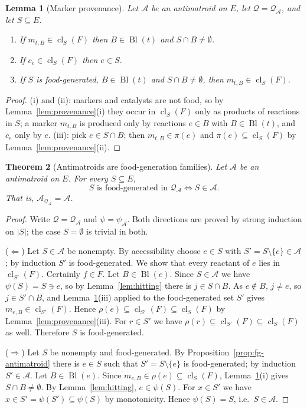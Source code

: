 \documentclass[11pt,a4paper]{article}
\theoremstyle{plain}
\newtheorem{theorem}{Theorem}[section]
\newtheorem{lemma}[theorem]{Lemma}
\theoremstyle{definition}
\theoremstyle{remark}
\newcommand{\cl}{\operatorname{cl}}
\newcommand{\Bl}{\operatorname{Bl}}
\newcommand{\cA}{\mathcal{A}}
\newcommand{\cQ}{\mathcal{Q}}
\begin{document}
\begin{lemma}[Marker provenance]\label{lem:marker-provenance}
Let $\cA$ be an antimatroid on $E$, let $\cQ=\cQ_{\cA}$, and let $S\subseteq E$.
\begin{enumerate}[label=(\roman*)]
\item If $m_{t,B}\in\cl_S(F)$ then $B\in\Bl(t)$ and $S\cap B\neq\emptyset$.
\item If $c_e\in\cl_S(F)$ then $e\in S$.
\item If $S$ is food-generated, $B\in\Bl(t)$ and $S\cap B\neq\emptyset$, then $m_{t,B}\in\cl_S(F)$.
\end{enumerate}
\end{lemma}

\begin{proof}
(i) and (ii): markers and catalysts are not food, so by Lemma~\ref{lem:provenance}(i) they occur in $\cl_S(F)$ only as products of reactions in $S$; a marker $m_{t,B}$ is produced only by reactions $e\in B$ with $B\in\Bl(t)$, and $c_e$ only by $e$. (iii): pick $e\in S\cap B$; then $m_{t,B}\in\pi(e)$ and $\pi(e)\subseteq\cl_S(F)$ by Lemma~\ref{lem:provenance}(ii).
\end{proof}

\begin{theorem}[Antimatroids are food-generation families]\label{thm:antimatroid-realization}
Let $\cA$ be an antimatroid on $E$. For every $S\subseteq E$,
\[
S\text{ is food-generated in }\cQ_{\cA}\iff S\in\cA.
\]
That is, $\cA_{\cQ_{\cA}}=\cA$.
\end{theorem}

\begin{proof}
Write $\cQ=\cQ_{\cA}$ and $\psi=\psi_{\cA}$. Both directions are proved by strong induction on $|S|$; the case $S=\emptyset$ is trivial in both.

($\Leftarrow$) Let $S\in\cA$ be nonempty. By accessibility choose $e\in S$ with $S'=S\setminus\{e\}\in\cA$; by induction $S'$ is food-generated. We show that every reactant of $e$ lies in $\cl_{S'}(F)$. Certainly $f\in F$. Let $B\in\Bl(e)$. Since $S\in\cA$ we have $\psi(S)=S\ni e$, so by Lemma~\ref{lem:hitting} there is $j\in S\cap B$. As $e\notin B$, $j\neq e$, so $j\in S'\cap B$, and Lemma~\ref{lem:marker-provenance}(iii) applied to the food-generated set $S'$ gives $m_{e,B}\in\cl_{S'}(F)$. Hence $\rho(e)\subseteq\cl_{S'}(F)\subseteq\cl_S(F)$ by Lemma~\ref{lem:provenance}(iii). For $r\in S'$ we have $\rho(r)\subseteq\cl_{S'}(F)\subseteq\cl_S(F)$ as well. Therefore $S$ is food-generated.

($\Rightarrow$) Let $S$ be nonempty and food-generated. By Proposition~\ref{prop:fg-antimatroid} there is $e\in S$ such that $S'=S\setminus\{e\}$ is food-generated; by induction $S'\in\cA$. Let $B\in\Bl(e)$. Since $m_{e,B}\in\rho(e)\subseteq\cl_S(F)$, Lemma~\ref{lem:marker-provenance}(i) gives $S\cap B\neq\emptyset$. By Lemma~\ref{lem:hitting}, $e\in\psi(S)$. For $x\in S'$ we have $x\in S'=\psi(S')\subseteq\psi(S)$ by monotonicity. Hence $\psi(S)=S$, i.e.\ $S\in\cA$.
\end{proof}
\end{document}
